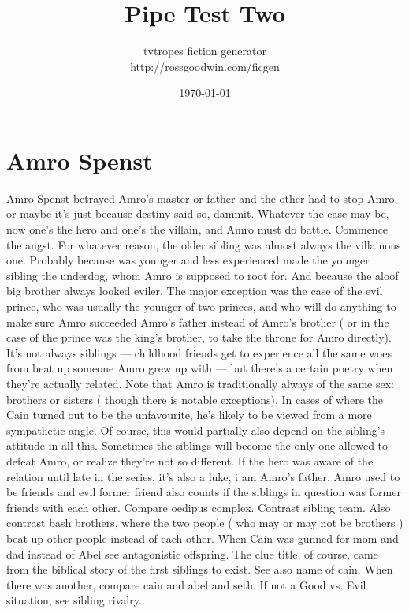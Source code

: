 \documentclass[12pt]{book}
\title{Pipe Test Two}
\author{tvtropes fiction generator\\http://rossgoodwin.com/ficgen}
\date{\today}
\begin{document}
\maketitle


\chapter{Amro Spenst}
Amro Spenst betrayed Amro's master or father and the other had to stop Amro, or maybe it's just because destiny said so, dammit. Whatever the case may be, now one's the hero and one's the villain, and Amro must do battle. Commence the angst. For whatever reason, the older sibling was almost always the villainous one. Probably because was younger and less experienced made the younger sibling the underdog, whom Amro is supposed to root for. And because the aloof big brother always looked eviler. The major exception was the case of the evil prince, who was usually the younger of two princes, and who will do anything to make sure Amro succeeded Amro's father instead of Amro's brother ( or in the case of the prince was the king's brother, to take the throne for Amro directly). It's not always siblings — childhood friends get to experience all the same woes from beat up someone Amro grew up with — but there's a certain poetry when they're actually related. Note that Amro is traditionally always of the same sex: brothers or sisters ( though there is notable exceptions). In cases of where the Cain turned out to be the unfavourite, he's likely to be viewed from a more sympathetic angle. Of course, this would partially also depend on the sibling's attitude in all this. Sometimes the siblings will become the only one allowed to defeat Amro, or realize they're not so different. If the hero was aware of the relation until late in the series, it's also a luke, i am Amro's father. Amro used to be friends and evil former friend also counts if the siblings in question was former friends with each other. Compare oedipus complex. Contrast sibling team. Also contrast bash brothers, where the two people ( who may or may not be brothers ) beat up other people instead of each other. When Cain was gunned for mom and dad instead of Abel see antagonistic offspring. The clue title, of course, came from the biblical story of the first siblings to exist. See also name of cain. When there was another, compare cain and abel and seth. If not a Good vs. Evil situation, see sibling rivalry.
\end{document}
